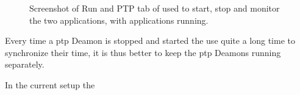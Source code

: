 \begin{figure}[H]
    \caption{Screenshot of Run and PTP tab of \srgui used to start, stop and monitor the two \py applications, with applications running.}
    \label{fig:gui_map}
\end{figure}

Every time a \gls{ptp} Deamon is stopped and started the \cams use quite a long time to synchronize their time, it is thus better to keep the \gls{ptp} Deamons running separately.

In the current setup the